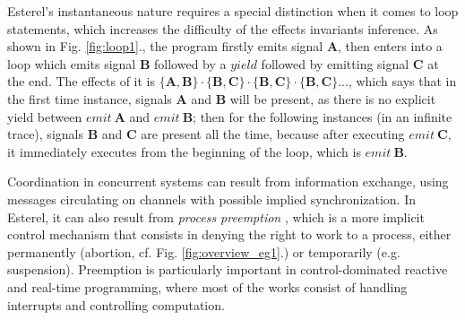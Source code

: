 \documentclass[acmsmall,review,anonymous]{acmart}\settopmatter{printfolios=true,printccs=false,printacmref=false}
\newcommand{\code}[1]{{\tt{\ensuremath{\m{#1}}}}}
\newcommand{\m}{\mathit}
\newcommand\figref[1]{Fig. \textcolor{black}{\ref{#1}}.}
\begin{document}
Esterel's instantaneous nature requires a special distinction when it comes to loop statements, which increases the difficulty of the effects invariants inference.  
As shown in \figref{fig:loop1}, the program firstly emits signal {\textbf{A}}, then enters into a loop which emits signal \code{\textbf{B}} followed by a \code{\m{yield}} followed by emitting signal {\textbf{C}} at the end. 
The effects of it is $ \{\textbf{A}, \textbf{B}\} \cdot \{ \textbf{B}, \textbf{C}\} \cdot \{ \textbf{B}, \textbf{C}\} \cdot \{ \textbf{B}, \textbf{C}\} ...$,
which says that in the first time instance, signals {\textbf{A}} and {\textbf{B}} will be present, 
as there is no explicit yield between $emit\ \textbf{A}$ and $emit\ \textbf{B}$; 
then for the following instances (in an infinite trace), signals {\textbf{B}} and {\textbf{C}} are present all the time, because after executing $emit\ \textbf{C}$, it immediately executes from the beginning of the loop, which is $emit\ \textbf{B}$. 




Coordination in concurrent systems can result from information exchange, using messages circulating on channels with possible implied synchronization. In Esterel, it can also result from \emph{process preemption}  \cite{berry1993preemption}, which is a more implicit control mechanism that consists in denying the right to work to a process, either permanently (abortion, cf. \figref{fig:overview_eg1}) or temporarily (e.g. suspension). Preemption is particularly important in control-dominated reactive and real-time programming, where most of the works consist of handling interrupts and controlling computation.  



%
%
%
\end{document}
